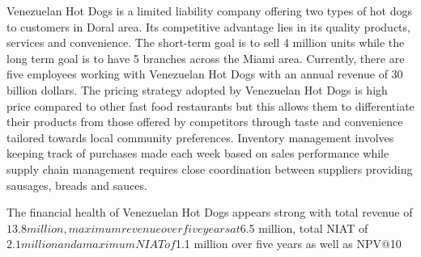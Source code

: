 

Venezuelan Hot Dogs is a limited liability company offering two types of hot dogs to customers in Doral area. Its competitive advantage lies in its quality products, services and convenience. The short-term goal is to sell 4 million units while the long term goal is to have 5 branches across the Miami area. Currently, there are five employees working with Venezuelan Hot Dogs with an annual revenue of 30 billion dollars. The pricing strategy adopted by Venezuelan Hot Dogs is high price compared to other fast food restaurants but this allows them to differentiate their products from those offered by competitors through taste and convenience tailored towards local community preferences. Inventory management involves keeping track of purchases made each week based on sales performance while supply chain management requires close coordination between suppliers providing sausages, breads and sauces. 

The financial health of Venezuelan Hot Dogs appears strong with total revenue of $13.8 million, maximum revenue over five years at $6.5 million, total NIAT of $2.1 million and a maximum NIAT of $1.1 million over five years as well as NPV@10%